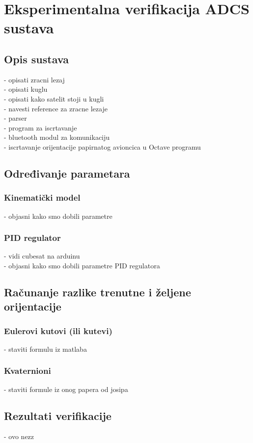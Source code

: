 \documentclass[times, utf8, diplomski, numeric]{templates/template}
\begin{document}
\chapter{Eksperimentalna verifikacija ADCS sustava}{
    \section{Opis sustava}{
        - opisati zracni lezaj\\
        - opisati kuglu\\
        - opisati kako satelit stoji u kugli\\
        - navesti reference za zracne lezaje\\
        - parser\\
        - program za iscrtavanje\\
        - bluetooth modul za komunikaciju\\
        - iscrtavanje orijentacije papirnatog avioncica u Octave programu\\
    }

    \section{Određivanje parametara}{
        \subsection{Kinematički model}{
            - objasni kako smo dobili parametre\\
        }
    
        \subsection{PID regulator}{
            - vidi cubesat na arduinu\\
            - objasni kako smo dobili parametre PID regulatora\\
        }
    }

    \section{Računanje razlike trenutne i željene orijentacije}{
        \subsection{Eulerovi kutovi (ili kutevi)}{
            - staviti formulu iz matlaba\\
        }

        \subsection{Kvaternioni}{
            - staviti formule iz onog papera od josipa\\
        }
    }

    \section{Rezultati verifikacije}{
        - ovo nezz\\
    }
}
\end{document}
